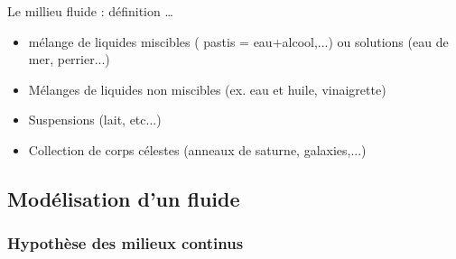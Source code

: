 \begin{frame}{Le millieu fluide : définition \ldots}
\begin{itemize}[<+-| alert@+>]
\item mélange de liquides miscibles	
	( pastis = eau+alcool,...) ou solutions (eau de mer, perrier...)

\item Mélanges de liquides non miscibles (ex. eau et huile, vinaigrette)

\item Suspensions (lait, etc...)

\item Collection de corps célestes (anneaux de saturne, galaxies,...)
	
\end{itemize}


\end{frame}



\subsection{Modélisation d'un fluide}

\subsubsection{Hypothèse des milieux continus}


